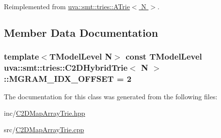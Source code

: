 Reimplemented from \hyperlink{classuva_1_1smt_1_1tries_1_1_a_trie_a4c523028bdf0949d762d1bbfd3fdc262}{uva\+::smt\+::tries\+::\+A\+Trie$<$ N $>$}.



\subsection{Member Data Documentation}
\hypertarget{classuva_1_1smt_1_1tries_1_1_c2_d_hybrid_trie_aae334ae9035f1260c174cebfcd80d941}{}
\subsubsection[{M\+G\+R\+A\+M\+\_\+\+I\+D\+X\+\_\+\+O\+F\+F\+S\+E\+T}]{\setlength{\rightskip}{0pt plus 5cm}template$<$T\+Model\+Level N$>$ const {\bf T\+Model\+Level} {\bf uva\+::smt\+::tries\+::\+C2\+D\+Hybrid\+Trie}$<$ N $>$\+::M\+G\+R\+A\+M\+\_\+\+I\+D\+X\+\_\+\+O\+F\+F\+S\+E\+T = 2\hspace{0.3cm}{\ttfamily [static]}}\label{classuva_1_1smt_1_1tries_1_1_c2_d_hybrid_trie_aae334ae9035f1260c174cebfcd80d941}


The documentation for this class was generated from the following files\+:\begin{DoxyCompactItemize}
\item 
inc/\hyperlink{_c2_d_map_array_trie_8hpp}{C2\+D\+Map\+Array\+Trie.\+hpp}\item 
src/\hyperlink{_c2_d_map_array_trie_8cpp}{C2\+D\+Map\+Array\+Trie.\+cpp}\end{DoxyCompactItemize}

